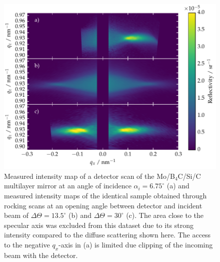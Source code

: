 \begin{figure}[htbp]
        \includegraphics[width=
        \textwidth]{img/PTB17_diffuse_scattering_multiple_geometries} \caption{Measured intensity map of a detector scan of the Mo/B$_4$C/Si/C multilayer mirror at an angle of incidence $\alpha_i = 6.75^\circ$ (a) and measured intensity maps of the identical sample obtained through rocking scans at an opening angle between detector and incident beam of $\Delta \Theta = 13.5^\circ$ (b) and $\Delta \Theta = 30^\circ$ (c). The area close to the specular axis was excluded from this dataset due to its strong intensity compared to the diffuse scattering shown here. The access to the negative $q_x$-axis in (a) is limited due clipping of the incoming beam with the detector.
}
\end{figure}
